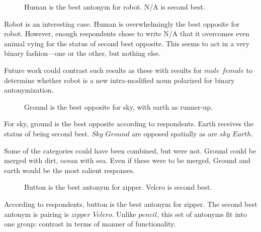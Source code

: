 \begin{figure}[here]
	\centering
	\caption{Human is the best antonym for robot.  N/A is second best.}
	\label{fig:robot_responses}
\end{figure}

Robot is an interesting case.  Human is overwhelmingly the best opposite for robot.  However, enough respondents chose to write N/A that it overcomes even animal vying for the status of second best opposite.  This seems to act in a very binary fashion—one or the other, but nothing else.  

Future work could contrast such results as these with results for $male$ \opp $female$ to determine whether robot is a new intra-modified noun polarized for binary antonymization.

\begin{figure}[here]
	\centering
	\caption{Ground is the best opposite for sky, with earth as runner-up.}
	\label{fig:sky_responses}
\end{figure}


For sky, ground is the best opposite according to respondents.  Earth receives the status of being second best.  $Sky$ \opp $Ground$ are opposed spatially as are $sky$ \opp $Earth$.  

Some of the categories could have been combined, but were not. Ground could be merged with dirt, ocean with sea.  Even if these were to be merged, Ground and earth would be the most salient responses.

\begin{figure}[here]
	\centering
	\caption{Button is the best antonym for zipper. Velcro is second best.}
	\label{fig:zipper_responses}
\end{figure}

According to respondents, button is the best antonym for zipper.  The second best antonym is pairing is $zipper$ \opp $Velcro$.  Unlike $pencil$, this set of antonyms fit into one group: contrast in terms of manner of functionality.
